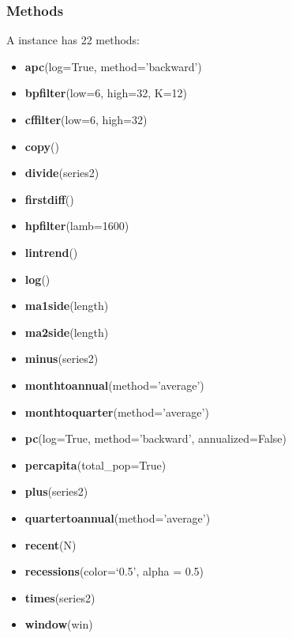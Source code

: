 \documentclass[letterpaper,10pt,openany,oneside]{sphinxmanual}
\begin{document}
\subsubsection{Methods}
\label{fredpy_examples:Methods}
A {\hyperref[series_class:fredpy.series]{}} instance has 22 methods:
\begin{itemize}
\item {} 
\textbf{apc}(log=True, method='backward')

\item {} 
\textbf{bpfilter}(low=6, high=32, K=12)

\item {} 
\textbf{cffilter}(low=6, high=32)

\item {} 
\textbf{copy}()

\item {} 
\textbf{divide}(series2)

\item {} 
\textbf{firstdiff}()

\item {} 
\textbf{hpfilter}(lamb=1600)

\item {} 
\textbf{lintrend}()

\item {} 
\textbf{log}()

\item {} 
\textbf{ma1side}(length)

\item {} 
\textbf{ma2side}(length)

\item {} 
\textbf{minus}(series2)

\item {} 
\textbf{monthtoannual}(method='average')

\item {} 
\textbf{monthtoquarter}(method='average')

\item {} 
\textbf{pc}(log=True, method='backward', annualized=False)

\item {} 
\textbf{percapita}(total\_pop=True)

\item {} 
\textbf{plus}(series2)

\item {} 
\textbf{quartertoannual}(method='average')

\item {} 
\textbf{recent}(N)

\item {} 
\textbf{recessions}(color=`0.5', alpha = 0.5)

\item {} 
\textbf{times}(series2)

\item {} 
\textbf{window}(win)

\end{itemize}
\end{document}
